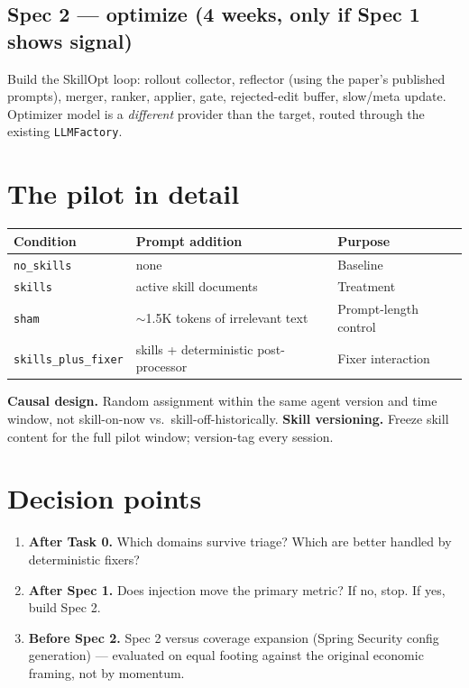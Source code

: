 \documentclass[11pt,a4paper]{article}
\begin{document}
\subsection{Spec 2 --- optimize (4 weeks, only if Spec 1 shows signal)}

Build the SkillOpt loop: rollout collector, reflector (using the
paper's published prompts), merger, ranker, applier, gate, rejected-edit
buffer, slow/meta update. Optimizer model is a \emph{different} provider
than the target, routed through the existing \texttt{LLMFactory}.

\section{The pilot in detail}

\begin{table}[h]
\centering
\small
\begin{tabular}{@{}lll@{}}
\toprule
Condition & Prompt addition & Purpose \\
\midrule
\texttt{no\_skills} & none & Baseline \\
\texttt{skills} & active skill documents & Treatment \\
\texttt{sham} & \(\sim\)1.5K tokens of irrelevant text & Prompt-length control \\
\texttt{skills\_plus\_fixer} & skills + deterministic post-processor & Fixer interaction \\
\bottomrule
\end{tabular}
\end{table}

\noindent\textbf{Causal design.} Random assignment within the same
agent version and time window, not skill-on-now vs.\ skill-off-historically.
\textbf{Skill versioning.} Freeze skill content for the full pilot
window; version-tag every session.

\section{Decision points}

\begin{enumerate}[leftmargin=1.4em]
  \item \textbf{After Task 0.} Which domains survive triage? Which are
  better handled by deterministic fixers?
  \item \textbf{After Spec 1.} Does injection move the primary metric?
  If no, stop. If yes, build Spec 2.
  \item \textbf{Before Spec 2.} Spec 2 versus coverage expansion
  (Spring Security config generation) --- evaluated on equal footing
  against the original economic framing, not by momentum.
\end{enumerate}
\end{document}

